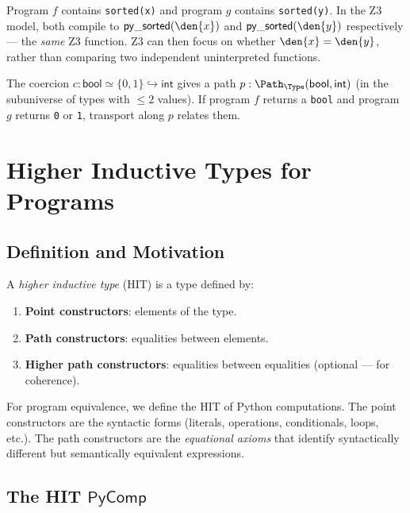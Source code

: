 \begin{example}
Program $f$ contains \texttt{sorted(x)} and program $g$ contains
\texttt{sorted(y)}.  In the Z3 model, both compile to
$\mathsf{py\_sorted}(\den{x})$ and $\mathsf{py\_sorted}(\den{y})$
respectively --- the \emph{same} Z3 function.  Z3 can then focus on
whether $\den{x} = \den{y}$, rather than comparing two independent
uninterpreted functions.
\end{example}

\begin{example}
The coercion $c : \mathsf{bool} \simeq \{0, 1\} \hookrightarrow
\mathsf{int}$ gives a path $p : \Path_\Type(\mathsf{bool},
\mathsf{int})$ (in the subuniverse of types with $\leq 2$ values).
If program $f$ returns a \texttt{bool} and program $g$ returns
\texttt{0} or \texttt{1}, transport along $p$ relates them.
\end{example}


\chapter{Higher Inductive Types for Programs}
\label{ch:hits}

\section{Definition and Motivation}

A \emph{higher inductive type} (HIT) is a type defined by:
\begin{enumerate}
  \item \textbf{Point constructors}: elements of the type.
  \item \textbf{Path constructors}: equalities between elements.
  \item \textbf{Higher path constructors}: equalities between
    equalities (optional --- for coherence).
\end{enumerate}

For program equivalence, we define the HIT of Python computations.
The point constructors are the syntactic forms (literals, operations,
conditionals, loops, etc.).  The path constructors are the
\emph{equational axioms} that identify syntactically different but
semantically equivalent expressions.

\section{The HIT $\mathsf{PyComp}$}

